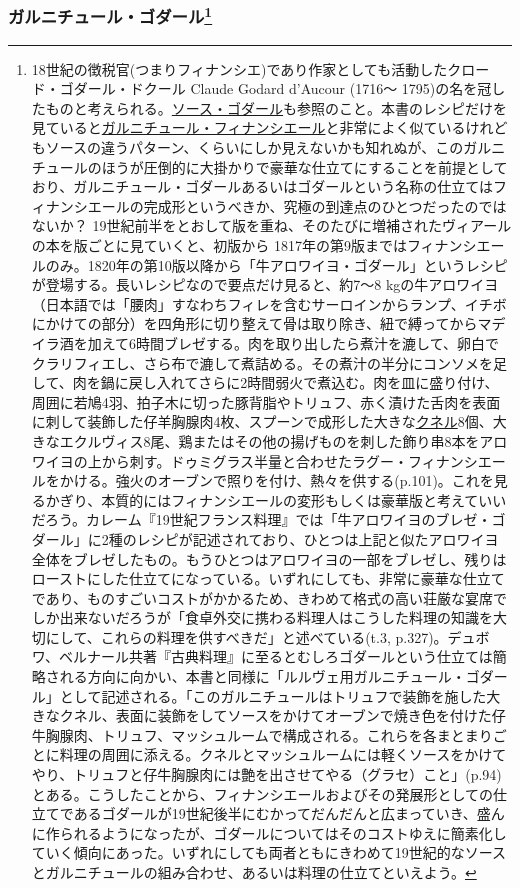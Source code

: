 \begin{recette}
{\subsubsection[ガルニチュール・ゴダール]{\texorpdfstring{ガルニチュール・ゴダール\footnote{18世紀の徴税官(つまりフィナンシエ)であり作家としても活動したクロード・ゴダール・ドクール
  Claude Godard d'Aucour (1716〜
  1795)の名を冠したものと考えられる。\protect\hyperlink{sauce-godard}{ソース・ゴダール}も参照のこと。本書のレシピだけを見ていると\protect\hyperlink{garniture-a-la-financiere}{ガルニチュール・フィナンシエール}と非常によく似ているけれどもソースの違うパターン、くらいにしか見えないかも知れぬが、このガルニチュールのほうが圧倒的に大掛かりで豪華な仕立てにすることを前提としており、ガルニチュール・ゴダールあるいはゴダールという名称の仕立てはフィナンシエールの完成形というべきか、究極の到達点のひとつだったのではないか？
  19世紀前半をとおして版を重ね、そのたびに増補されたヴィアールの本を版ごとに見ていくと、初版から
  1817年の第9版まではフィナンシエールのみ。1820年の第10版以降から「牛アロワイヨ・ゴダール」というレシピが登場する。長いレシピなので要点だけ見ると、約7〜8
  kgの牛アロワイヨ（日本語では「腰肉」すなわちフィレを含むサーロインからランプ、イチボにかけての部分）を四角形に切り整えて骨は取り除き、紐で縛ってからマデイラ酒を加えて6時間ブレゼする。肉を取り出したら煮汁を漉して、卵白でクラリフィエし、さら布で漉して煮詰める。その煮汁の半分にコンソメを足して、肉を鍋に戻し入れてさらに2時間弱火で煮込む。肉を皿に盛り付け、周囲に若鳩4羽、拍子木に切った豚背脂やトリュフ、赤く漬けた舌肉を表面に刺して装飾した仔羊胸腺肉4枚、スプーンで成形した大きな\protect\hyperlink{quenelles}{クネル}8個、大きなエクルヴィス8尾、鶏またはその他の揚げものを刺した飾り串8本をアロワイヨの上から刺す。ドゥミグラス半量と合わせたラグー・フィナンシエールをかける。強火のオーブンで照りを付け、熱々を供する(p.101)。これを見るかぎり、本質的にはフィナンシエールの変形もしくは豪華版と考えていいだろう。カレーム『19世紀フランス料理』では「牛アロワイヨのブレゼ・ゴダール」に2種のレシピが記述されており、ひとつは上記と似たアロワイヨ全体をブレゼしたもの。もうひとつはアロワイヨの一部をブレゼし、残りはローストにした仕立てになっている。いずれにしても、非常に豪華な仕立てであり、ものすごいコストがかかるため、きわめて格式の高い荘厳な宴席でしか出来ないだろうが「食卓外交に携わる料理人はこうした料理の知識を大切にして、これらの料理を供すべきだ」と述べている(t.3,
  p.327)。デュボワ、ベルナール共著『古典料理』に至るとむしろゴダールという仕立ては簡略される方向に向かい、本書と同様に「ルルヴェ用ガルニチュール・ゴダール」として記述される。「このガルニチュールはトリュフで装飾を施した大きなクネル、表面に装飾をしてソースをかけてオーブンで焼き色を付けた仔牛胸腺肉、トリュフ、マッシュルームで構成される。これらを各まとまりごとに料理の周囲に添える。クネルとマッシュルームには軽くソースをかけてやり、トリュフと仔牛胸腺肉には艶を出させてやる（グラセ）こと」(p.94)とある。こうしたことから、フィナンシエールおよびその発展形としての仕立てであるゴダールが19世紀後半にむかってだんだんと広まっていき、盛んに作られるようになったが、ゴダールについてはそのコストゆえに簡素化していく傾向にあった。いずれにしても両者ともにきわめて19世紀的なソースとガルニチュールの組み合わせ、あるいは料理の仕立てといえよう。}}{ガルニチュール・ゴダール}}\label{garniture-godard}}


\end{recette}
